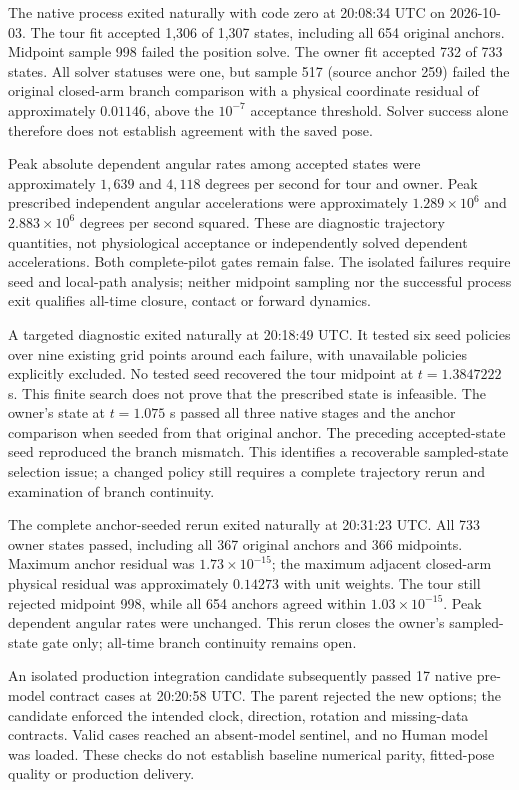 \documentclass[11pt,a4paper]{article}
\begin{document}
The native process exited naturally with code zero at 20:08:34 UTC on
2026-10-03. The tour fit accepted 1,306 of 1,307 states, including all
654 original anchors. Midpoint sample 998 failed the position solve.
The owner fit accepted 732 of 733 states. All solver statuses were one,
but sample 517 (source anchor 259) failed the original closed-arm branch
comparison with a physical coordinate residual of approximately
$0.01146$, above the $10^{-7}$ acceptance threshold. Solver success
alone therefore does not establish agreement with the saved pose.

Peak absolute dependent angular rates among accepted states were
approximately $1,639$ and $4,118$ degrees per second for tour and owner.
Peak prescribed independent angular accelerations were approximately
$1.289\times10^6$ and $2.883\times10^6$ degrees per second squared.
These are diagnostic trajectory quantities, not physiological acceptance
or independently solved dependent accelerations. Both complete-pilot
gates remain false. The isolated failures require seed and local-path
analysis; neither midpoint sampling nor the successful process exit
qualifies all-time closure, contact or forward dynamics.

A targeted diagnostic exited naturally at 20:18:49 UTC. It tested six
seed policies over nine existing grid points around each failure, with
unavailable policies explicitly excluded. No tested seed recovered the
tour midpoint at $t=1.3847222$ s. This finite search does not prove that
the prescribed state is infeasible. The owner's state at $t=1.075$ s
passed all three native stages and the anchor comparison when seeded
from that original anchor. The preceding accepted-state seed reproduced
the branch mismatch. This identifies a recoverable sampled-state
selection issue; a changed policy still requires a complete trajectory
rerun and examination of branch continuity.

The complete anchor-seeded rerun exited naturally at 20:31:23 UTC.
All 733 owner states passed, including all 367 original anchors and
366 midpoints. Maximum anchor residual was $1.73\times10^{-15}$;
the maximum adjacent closed-arm physical residual was approximately
$0.14273$ with unit weights. The tour still rejected midpoint 998,
while all 654 anchors agreed within $1.03\times10^{-15}$.
Peak dependent angular rates were unchanged. This rerun closes the
owner's sampled-state gate only; all-time branch continuity remains open.

An isolated production integration candidate subsequently passed 17
native pre-model contract cases at 20:20:58 UTC. The parent rejected the
new options; the candidate enforced the intended clock, direction,
rotation and missing-data contracts. Valid cases reached an absent-model
sentinel, and no Human model was loaded. These checks do not establish
baseline numerical parity, fitted-pose quality or production delivery.
\end{document}
